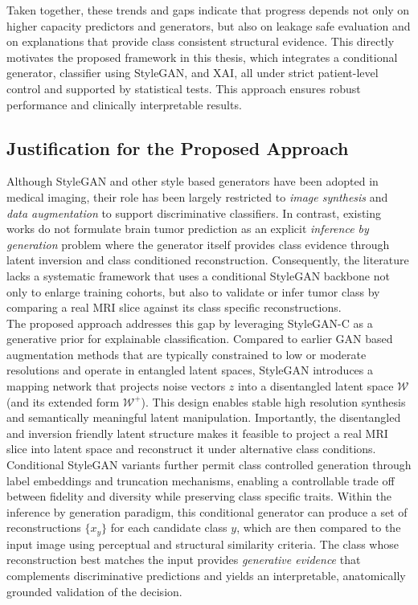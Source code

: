 \noindent
Taken together, these trends and gaps indicate that progress depends not only on higher capacity predictors and generators, but also on leakage safe evaluation and on explanations that provide class consistent structural evidence. This directly motivates the proposed framework in this thesis, which integrates a conditional generator, classifier using StyleGAN, and XAI, all under strict patient-level control and supported by statistical tests. This approach ensures robust performance and clinically interpretable results.

\subsection{Justification for the Proposed Approach}

Although StyleGAN and other style based generators have been adopted in medical imaging, their role has been largely restricted to \emph{image synthesis} and \emph{data augmentation} to support discriminative classifiers. In contrast, existing works do not formulate brain tumor prediction as an explicit \emph{inference by generation} problem where the generator itself provides class evidence through latent inversion and class conditioned reconstruction. Consequently, the literature lacks a systematic framework that uses a conditional StyleGAN backbone not only to enlarge training cohorts, but also to validate or infer tumor class by comparing a real MRI slice against its class specific reconstructions.\\

The proposed approach addresses this gap by leveraging StyleGAN-C as a generative prior for explainable classification. Compared to earlier GAN based augmentation methods that are typically constrained to low or moderate resolutions and operate in entangled latent spaces, StyleGAN introduces a mapping network that projects noise vectors $z$ into a disentangled latent space $\mathcal{W}$ (and its extended form $\mathcal{W}^+$). This design enables stable high resolution synthesis and semantically meaningful latent manipulation. Importantly, the disentangled and inversion friendly latent structure makes it feasible to project a real MRI slice into latent space and reconstruct it under alternative class conditions.\\

Conditional StyleGAN variants further permit class controlled generation through label embeddings and truncation mechanisms, enabling a controllable trade off between fidelity and diversity while preserving class specific traits. Within the inference by generation paradigm, this conditional generator can produce a set of reconstructions $\{x_y\}$ for each candidate class $y$, which are then compared to the input image using perceptual and structural similarity criteria. The class whose reconstruction best matches the input provides \emph{generative evidence} that complements discriminative predictions and yields an interpretable, anatomically grounded validation of the decision.\\

